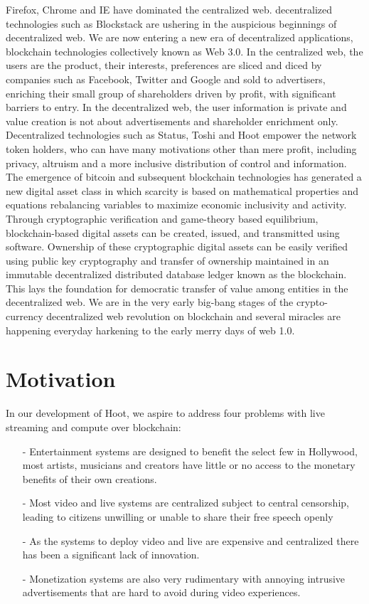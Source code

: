 \documentclass{article}
\begin{document}
 Firefox, Chrome and IE have dominated the centralized web. decentralized technologies
such as Blockstack are ushering in the auspicious beginnings of decentralized web. 
 We are now entering a new era of decentralized applications, blockchain technologies collectively known as Web 3.0. In the centralized web, the users are the product, their interests, preferences are sliced and diced by companies such as Facebook, Twitter and Google and sold to advertisers, enriching their
small group of shareholders driven by profit, with significant barriers to entry. In the
decentralized web, the user information is private and value creation is not about advertisements and shareholder enrichment only. Decentralized
technologies such as Status, Toshi and Hoot empower the network token holders, who can have many motivations other than mere profit, including privacy, altruism and a more inclusive distribution of control and information. The emergence of bitcoin and subsequent blockchain technologies has generated a new digital asset class in which scarcity is based on mathematical properties and equations rebalancing variables to maximize economic inclusivity and activity. Through cryptographic verification and game-theory based equilibrium, blockchain-based digital assets can be created, issued, and transmitted using software. Ownership of these cryptographic digital assets can be easily verified using public key cryptography and transfer of ownership maintained in an immutable decentralized distributed database ledger known as the blockchain. This lays the foundation for democratic transfer of value among entities in the decentralized web.
 We are in the very early big-bang stages of the crypto-currency decentralized web revolution on blockchain and several miracles are happening everyday harkening to the early merry days of web 1.0.

\section{Motivation}
In our development of Hoot, we aspire to address four problems with live streaming and compute over blockchain:
\begin{itemize}
\item[-]Entertainment systems are designed to benefit the select few  in Hollywood, most artists, musicians and creators have little or no access to the monetary  benefits of their own creations.
\item[-]Most video and live systems are centralized subject to  central censorship, leading to citizens unwilling or unable to  share their free speech openly
\item[-]As the systems to deploy video and live are expensive and  centralized there has been a significant lack of innovation.
\item[-]Monetization systems are also very rudimentary with annoying  intrusive advertisements that are hard to avoid during video  experiences. 
\end{itemize}
\end{document}
